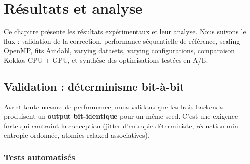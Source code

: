 \chapter{Résultats et analyse}
\label{chap:resultats}

Ce chapitre présente les résultats expérimentaux et leur analyse. Nous suivons le flux : validation de la correction, performance séquentielle de référence, scaling OpenMP, fits Amdahl, varying datasets, varying configurations, comparaison Kokkos CPU + GPU, et synthèse des optimisations testées en A/B.

\section{Validation : déterminisme bit-à-bit}
\label{sec:res:validation}

Avant toute mesure de performance, nous validons que les trois backends produisent un \textbf{output bit-identique} pour un même seed. C'est une exigence forte qui contraint la conception (jitter d'entropie déterministe, réduction min-entropie ordonnée, atomics relaxed associatives).

\subsection{Tests automatisés}

